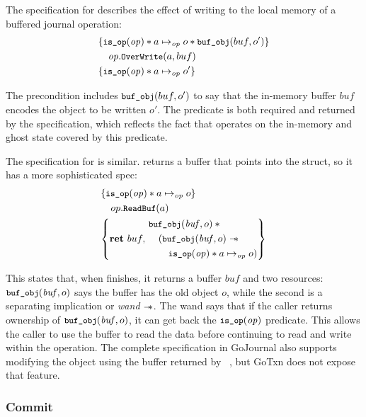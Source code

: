 The specification for  describes the effect of writing to the
local memory of a buffered journal operation:
%
\begin{align*}
  \hoareV{\cc{is_op}(\mathit{op}) \sep a \mapstoOp o \sep \cc{buf_obj}(buf, o')}%
        {\mathit{op}.\cc{OverWrite}(a, buf)}%
        {\cc{is_op}(\mathit{op}) \sep a \mapstoOp o'}
\end{align*}

The precondition includes $\cc{buf_obj}(buf, o')$ to say that the in-memory
buffer $buf$ encodes the object to be written $o'$.
The  predicate is both
required and returned by the specification, which reflects the fact that
 operates on the in-memory and ghost state covered by
this predicate.

The specification for  is similar. 
returns a buffer that points into the  struct, so it has a more
sophisticated spec:
%
\begin{align*}
  \hoareV{\cc{is_op}(\mathit{op}) \sep a \mapsto_{\mathit{op}} o}%
        {op.\cc{ReadBuf}(a)}%
        {\Ret{buf}
  \begin{aligned}
  &\cc{buf_obj}(\mathit{buf}, o) \sep \phantom{} \\
  &\quad( \cc{buf_obj}(\mathit{buf}, o) \wand \\
  &\quad\quad \cc{is_op}(\mathit{op}) \sep a \mapsto_{\mathit{op}} o )
    \end{aligned}}
\end{align*}

This states that, when  finishes, it returns a buffer $\mathit{buf}$
and two resources: $\cc{buf_obj}(\mathit{buf}, o)$ says the buffer has the old
object $o$, while the second is a separating implication or \emph{wand} $\mathrel{-\!\!\ast}$.
The wand says that if
the caller returns ownership of $\cc{buf_obj}(\mathit{buf}, o)$, it can get back
the $\cc{is_op}(\mathit{op})$ predicate. This allows the caller to use the
buffer to read the data before continuing to read and write within the
operation. The complete specification in GoJournal also supports modifying the
object using the buffer returned by ~\cite{chajed:gojournal}, but
GoTxn does not expose that feature.

\subsubsection{Commit}

